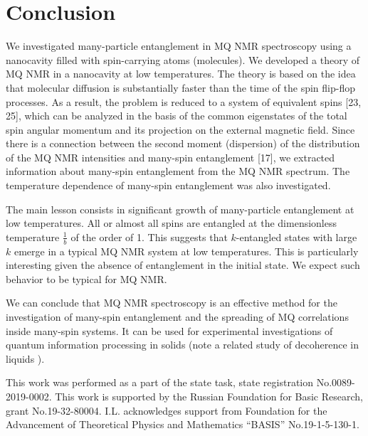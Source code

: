 \documentclass[
    pra,  
    twocolumn, 
    floatfix, 
    amsmath, 
    amssymb, 
    superscriptaddress
]{revtex4-1}
\begin{document}
\section{Conclusion} 
\label{sec:conslusions}
We investigated many-particle entanglement in MQ NMR spectroscopy using a nanocavity filled with spin-carrying atoms (molecules). 
We developed a theory of MQ NMR in a nanocavity at low temperatures. 
The theory is based on the idea that  molecular diffusion is substantially faster than the time of the spin flip-flop processes. 
As a result, the problem is reduced to a system of equivalent spins [23, 25], which can be analyzed in the basis of the common eigenstates of the total spin angular momentum and its projection on the external magnetic field. 
Since there is a connection between the second moment (dispersion) of the distribution of the MQ NMR intensities and many-spin entanglement [17], we extracted information about many-spin entanglement from the MQ NMR spectrum. The temperature dependence of many-spin entanglement was also investigated.
\par
The main lesson consists in significant growth of many-particle entanglement at low temperatures. 
All or almost all spins are entangled at the dimensionless temperature $\frac{1}{b}$ of the order of 1. 
This suggests that $k$-entangled states with large $k$ emerge in a typical MQ NMR system at low temperatures. 
This is particularly interesting given the absence of entanglement in the initial state. We expect such behavior to be typical for MQ NMR. 
\par
We can conclude that MQ NMR spectroscopy is an effective method for the investigation of many-spin entanglement and the spreading of MQ correlations inside many-spin systems. It can be used for experimental investigations of quantum information processing in solids (note a related study of decoherence in liquids \cite{HOU2017863}).
\par 



\begin{acknowledgments}
This work was performed as a part of the state task, state registration No.0089-2019-0002. This work is supported by the Russian Foundation for Basic Research, grant No.19-32-80004. I.L. acknowledges support from Foundation for the Advancement of Theoretical Physics and Mathematics “BASIS” No.19-1-5-130-1.  
\end{acknowledgments}

%


\end{document}
